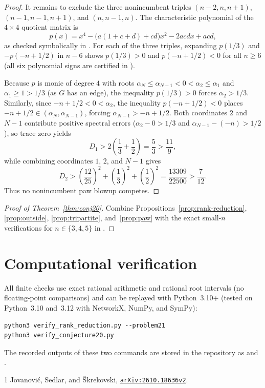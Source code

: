 \documentclass[10pt]{article}
\begin{document}
\begin{proof}
It remains to exclude the three nonincumbent triples $(n - 2, n, n + 1)$, $(n - 1, n - 1, n + 1)$, and $(n, n - 1, n)$. The characteristic polynomial of the $4 \times 4$ quotient matrix is
\[
p(x) = x^4 - \bigl(a(1 + c + d) + cd\bigr)x^2 - 2acdx + acd,
\]
as checked symbolically in \texttt{}. For each of the three triples, expanding $p(1/3)$ and $-p(-n + 1/2)$ in $n - 6$ shows $p(1/3) > 0$ and $p(-n + 1/2) < 0$ for all $n \geq 6$ (all six polynomial signs are certified in \texttt{}).

Because $p$ is monic of degree $4$ with roots $\alpha_N \leq \alpha_{N-1} < 0 < \alpha_2 \leq \alpha_1$ and $\alpha_1 \geq 1 > 1/3$ (as $G$ has an edge), the inequality $p(1/3) > 0$ forces $\alpha_2 > 1/3$. Similarly, since $-n + 1/2 < 0 < \alpha_2$, the inequality $p(-n + 1/2) < 0$ places $-n + 1/2 \in (\alpha_N, \alpha_{N-1})$, forcing $\alpha_{N-1} > -n + 1/2$. Both coordinates $2$ and $N - 1$ contribute positive spectral errors ($\alpha_2 - 0 > 1/3$ and $\alpha_{N-1} - (-n) > 1/2$), so trace zero yields
\[
D_1 > 2\left(\frac{1}{3} + \frac{1}{2}\right) = \frac{5}{3} > \frac{11}{9},
\]
while combining coordinates $1$, $2$, and $N - 1$ gives
\[
D_2 > \left(\frac{12}{25}\right)^2 + \left(\frac{1}{3}\right)^2 + \left(\frac{1}{2}\right)^2 = \frac{13309}{22500} > \frac{7}{12}.
\]
Thus no nonincumbent paw blowup competes.
\end{proof}

\begin{proof}[Proof of Theorem~\ref{thm:conj20}]
Combine Propositions~\ref{prop:rank-reduction}, \ref{prop:outside}, \ref{prop:tripartite}, and~\ref{prop:paw} with the exact small-$n$ verifications for $n \in \{3, 4, 5\}$ in \texttt{}.
\end{proof}

\section*{Computational verification}

All finite checks use exact rational arithmetic and rational root intervals (no floating-point comparisons) and can be replayed with Python~3.10+ (tested on Python~3.10 and~3.12 with NetworkX, NumPy, and SymPy):
\begin{verbatim}
python3 verify_rank_reduction.py --problem21
python3 verify_conjecture20.py
\end{verbatim}
The recorded outputs of these two commands are stored in the repository as \texttt{} and \texttt{}.

\begin{thebibliography}{1}
Jovanovi\'{c}, Sedlar, and \v{S}krekovski,
\href{https://arxiv.org/html/2610.18636v2#S5}{\texttt{arXiv:2610.18636v2}}.
\end{thebibliography}
\end{document}
